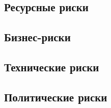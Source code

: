 \subsection{Ресурсные риски}



\subsection{Бизнес-риски}


\subsection{Технические риски}


\subsection{Политические риски}
